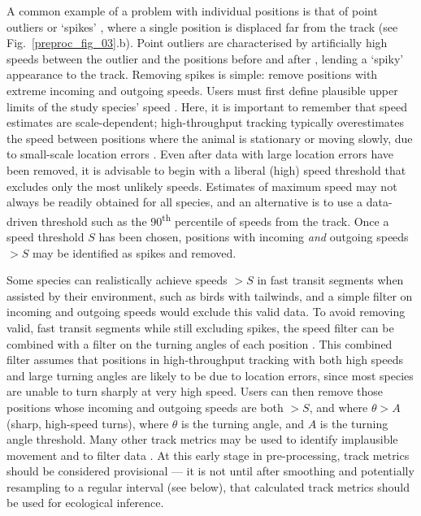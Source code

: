     A common example of a problem with individual positions is that of point outliers or `spikes' \citep{bjorneraas2010}, where a single position is displaced far from the track (see Fig.~\ref{preproc_fig_03}.b).
    Point outliers are characterised by artificially high speeds between the outlier and the positions before and after \citep[called incoming and outgoing speed, respectively;][]{bjorneraas2010}, lending a `spiky' appearance to the track.
    Removing spikes is simple: remove positions with extreme incoming and outgoing speeds.
    Users must first define plausible upper limits of the study species' speed \citep{calenge2009, seidel2018}.
    Here, it is important to remember that speed estimates are scale-dependent; high-throughput tracking typically overestimates the speed between positions where the animal is stationary or moving slowly, due to small-scale location errors \citep{ranacher2016, noonan2019}. 
    Even after data with large location errors have been removed, it is advisable to begin with a liberal (high) speed threshold that excludes only the most unlikely speeds.
    Estimates of maximum speed may not always be readily obtained for all species, and an alternative is to use a data-driven threshold such as the 90\textsuperscript{th} percentile of speeds from the track.
    Once a speed threshold $S$ has been chosen, positions with incoming \textit{and} outgoing speeds $> S$ may be identified as spikes and removed.

    Some species can realistically achieve speeds $> S$ in fast transit segments when assisted by their environment, such as birds with tailwinds, and a simple filter on incoming and outgoing speeds would exclude this valid data.
    To avoid removing valid, fast transit segments while still excluding spikes, the speed filter can be combined with a filter on the turning angles of each position \citep[see][]{bjorneraas2010, calenge2009}.
    This combined filter assumes that positions in high-throughput tracking with both high speeds and large turning angles are likely to be due to location errors, since most species are unable to turn sharply at very high speed.
    Users can then remove those positions whose incoming and outgoing speeds are both $> S$, and where $\theta > A$ (sharp, high-speed turns), where $\theta$ is the turning angle, and $A$ is the turning angle threshold.
    Many other track metrics may be used to identify implausible movement and to filter data \citep{seidel2018}.
    At this early stage in pre-processing, track metrics should be considered provisional --- it is not until after smoothing and potentially resampling to a regular interval (see below), that calculated track metrics should be used for ecological inference.

